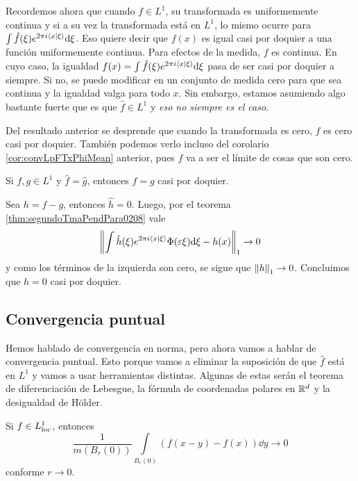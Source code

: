 \documentclass[12pt]{memoir}
\begin{document}
Recordemos ahora que cuando $f\in L^1$, su transformada es uniformemente continua y si a su vez la transformada está en $L^1$, lo mismo ocurre para $\int\hat f(\xi)e^{2\pi i\braket{x}{\xi}}\dd \xi$. Eso quiere decir que $f(x)$ es igual casi por doquier a una función uniformemente continua. Para efectos de la medida, $f$ es continua. En cuyo caso, la igualdad $f(x)=\int\hat f(\xi)e^{2\pi i\braket{x}{\xi}}\dd \xi$ pasa de ser casi por doquier a siempre. Si no, se puede modificar en un conjunto de medida cero para que sea continua y la igualdad valga para todo $x$. Sin embargo, estamos asumiendo algo bastante fuerte que es que $\hat{f}\in L^1$ y \emph{eso no siempre es el caso}.\par 
Del resultado anterior se desprende que cuando la transformada es cero, $f$ es cero casi por doquier. También podemos verlo incluso del corolario \ref{cor:convLpFTxPhiMean} anterior, pues $f$ va a ser el límite de cosas que son cero.

\begin{Cor}
  Si $f,g\in L^1$ y $\hat{f}=\hat{g}$, entonces $f=g$ casi por doquier. 
\end{Cor}

\begin{ptcbp}
  Sea $h=f-g$, entonces $\hat{h}=0$. Luego, por el teorema \ref{thm:segundoTmaPendPara0208} vale
  $$\left\|\int\hat{h}(\xi)e^{2\pi i\braket{x}{\xi}}\Phi(\varepsilon\xi)\dd\xi-h(x)\right\|_1\to0$$
  y como los términos de la izquierda son cero, se sigue que $\left\|h\right\|_1\to0$. Concluimos que $h=0$ casi por doquier.
\end{ptcbp}

\subsection{Convergencia puntual}

Hemos hablado de convergencia en norma, pero ahora vamos a hablar de convergencia puntual. Esto porque vamos a eliminar la suposición de que $\hat{f}$ está en $L^1$ y vamos a usar herramientas distintas. Algunas de estas serán el teorema de diferenciación de Lebesgue, la fórmula de coordenadas polares en $\mathbb{R}^d$ y la desigualdad de Hölder. 

\begin{Th}\label{thm:LebesgueDiffThm}
  Si $f\in L^1_{\text{loc}}$, entonces
  $$\frac{1}{m(B_r(0))}\int\limits_{B_r(0)}(f(x-y)-f(x))\dd y\to 0$$
  conforme $r\to 0$.
\end{Th}
\end{document}

